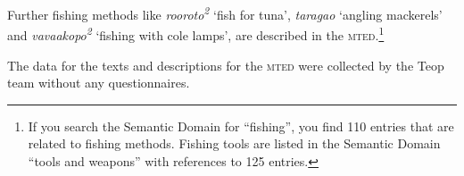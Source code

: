 \documentclass[output=paper]{langscibook}
\begin{document}
Further fishing methods like \textit{rooroto\textsuperscript{2}} `fish for tuna', \textit{taragao} `angling mackerels' and \textit{vavaakopo\textsuperscript{2}} `fishing with cole lamps', are described in the \textsc{mted}.\footnote{If you search the Semantic Domain for ``fishing'', you find 110 entries that are related to fishing methods. Fishing tools are listed in the Semantic Domain ``tools and weapons'' with references to 125 entries.}

The data for the texts and descriptions for the \textsc{mted} were collected by the Teop team without any questionnaires.
\end{document}
